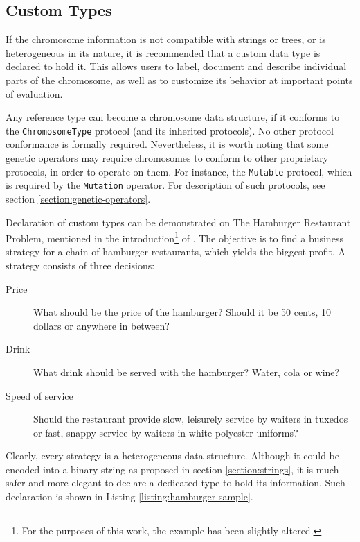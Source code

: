 \subsection{Custom Types}\label{section:custom-types}
If the chromosome information is not compatible with strings or trees, or is heterogeneous in its nature, it is recommended that a custom data type is declared to hold it. This allows users to label, document and describe individual parts of the chromosome, as well as to customize its behavior at important points of evaluation.

Any reference type can become a chromosome data structure, if it conforms to the \texttt{ChromosomeType} protocol (and its inherited protocols). No other protocol conformance is formally required. Nevertheless, it is worth noting that some genetic operators may require chromosomes to conform to other proprietary protocols, in order to operate on them. For instance, the \texttt{Mutable} protocol, which is required by the \texttt{Mutation} operator. For description of such protocols, see section \ref{section:genetic-operators}.

Declaration of custom types can be demonstrated on The Hamburger Restaurant Problem, mentioned in the introduction\footnote{For the purposes of this work, the example has been slightly altered.} of \cite{Koza1992}. The objective is to find a business strategy for a chain of hamburger restaurants, which yields the biggest profit. A strategy consists of three decisions:
~
\begin{description}
	\item[Price]
	What should be the price of the hamburger? Should it be 50 cents, 10 dollars or anywhere in between?

	\item[Drink]
	What drink should be served with the hamburger? Water, cola or wine?

	\item[Speed of service]
	Should the restaurant provide slow, leisurely service by waiters in tuxedos or fast, snappy service by waiters in white polyester uniforms?
\end{description}

Clearly, every strategy is a heterogeneous data structure. Although it could be encoded into a binary string as proposed in section \ref{section:strings}, it is much safer and more elegant to declare a dedicated type to hold its information. Such declaration is shown in Listing \ref{listing:hamburger-sample}.

